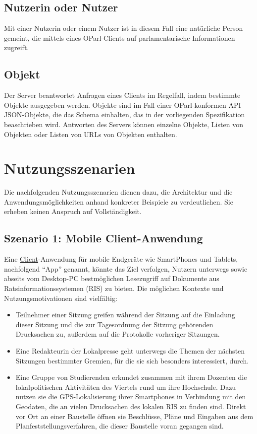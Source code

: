 \documentclass[,a4paper]{article}
\begin{document}
\subsection{Nutzerin oder Nutzer}\label{nutzerin}

Mit einer Nutzerin oder einem Nutzer ist in diesem Fall eine natürliche
Person gemeint, die mittels eines OParl-Clients auf parlamentarische
Informationen zugreift.

\subsection{Objekt}\label{objekt}

Der Server beantwortet Anfragen eines Clients im Regelfall, indem
bestimmte Objekte ausgegeben werden. Objekte sind im Fall einer
OParl-konformen API JSON-Objekte, die das Schema einhalten, das in der
vorliegenden Spezifikation beaschrieben wird. Antworten des Servers
können einzelne Objekte, Listen von Objekten oder Listen von URLs von
Objekten enthalten.

\section{Nutzungsszenarien}\label{nutzungsszenarien}

Die nachfolgenden Nutzungsszenarien dienen dazu, die Architektur und die
Anwendungsmöglichkeiten anhand konkreter Beispiele zu verdeutlichen. Sie
erheben keinen Anspruch auf Vollständigkeit.

\subsection{Szenario 1: Mobile
Client-Anwendung}\label{szenarioux5fmobileux5fclient}

Eine \hyperref[client]{Client}-Anwendung für mobile Endgeräte wie
SmartPhones und Tablets, nachfolgend ``App'' genannt, könnte das Ziel
verfolgen, Nutzern unterwegs sowie abseits vom Desktop-PC bestmöglichen
Lesezugriff auf Dokumente aus Ratsinformationssystemen (RIS) zu bieten.
Die möglichen Kontexte und Nutzungsmotivationen sind vielfältig:

\begin{itemize}
\item
  Teilnehmer einer Sitzung greifen während der Sitzung auf die Einladung
  dieser Sitzung und die zur Tagesordnung der Sitzung gehörenden
  Drucksachen zu, außerdem auf die Protokolle vorheriger Sitzungen.
\item
  Eine Redakteurin der Lokalpresse geht unterwegs die Themen der
  nächsten Sitzungen bestimmter Gremien, für die sie sich besonders
  interessiert, durch.
\item
  Eine Gruppe von Studierenden erkundet zusammen mit ihrem Dozenten die
  lokalpolitischen Aktivitäten des Viertels rund um ihre Hochschule.
  Dazu nutzen sie die GPS-Lokalisierung ihrer Smartphones in Verbindung
  mit den Geodaten, die an vielen Drucksachen des lokalen RIS zu finden
  sind. Direkt vor Ort an einer Baustelle öffnen sie Beschlüsse, Pläne
  und Eingaben aus dem Planfeststellungsverfahren, die dieser Baustelle
  voran gegangen sind.
\end{itemize}
\end{document}
